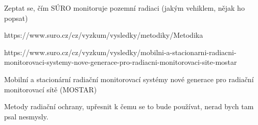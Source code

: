 

Zeptat se, čím SÚRO monitoruje pozemní radiaci (jakým vehiklem, nějak ho popsat)

https://www.suro.cz/cz/vyzkum/vysledky/metodiky/Metodika%

https://www.suro.cz/cz/vyzkum/vysledky/mobilni-a-stacionarni-radiacni-monitorovaci-systemy-nove-generace-pro-radiacni-monitorovaci-site-mostar

Mobilní a stacionární radiační monitorovací systémy nové generace pro radiační monitorovací sítě (MOSTAR)

Metody radiační ochrany, upřesnit k čemu se to bude používat, nerad bych tam psal nesmysly.